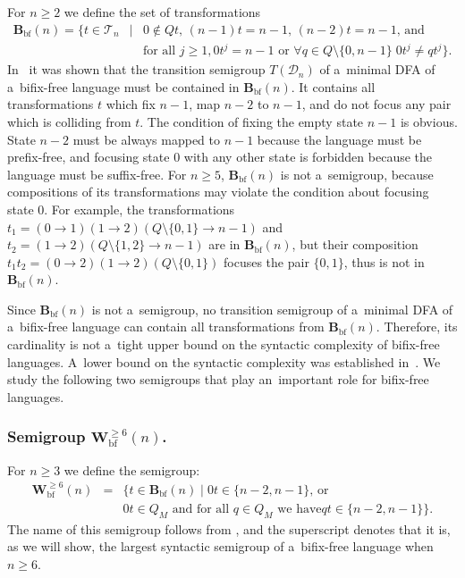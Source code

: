 \documentclass{amsart}
\renewcommand{\ge}{\geqslant}
\newcommand{\Bbf}{\mathbf{B}_{\mathrm{bf}}}
\newcommand{\Wbf}{\mathbf{W}^{\ge 6}_{\mathrm{bf}}}
\newcommand{\cD}{{\mathcal D}}
\newcommand{\cT}{{\mathcal T}}
\begin{document}
For $n \ge 2$ we define the set of transformations
\begin{eqnarray*}
\Bbf(n) = \{t \in \cT_n & \mid & 0 \notin Qt\text{, }(n-1)t=n-1\text{, }(n-2)t=n-1\text{, and}\\
& & \text{for all }j\ge 1, 0t^j = n-1\text{ or }\forall q \in Q\setminus \{0,n-1\}\;0t^j \neq qt^j\}.
\end{eqnarray*}
In~\cite{BLY12} it was shown that the transition semigroup $T(\cD_n)$ of a~minimal DFA of a~bifix-free
language must be contained in $\Bbf(n)$.
It contains all transformations $t$ which fix $n-1$, map $n-2$ to $n-1$, and do not focus any
pair which is colliding from $t$.
The condition of fixing the empty state $n-1$ is obvious. State $n-2$ must be always mapped to $n-1$ because the language must be prefix-free, and focusing state $0$ with any other state is forbidden because the language must be suffix-free.
For $n \ge 5$, $\Bbf(n)$ is not a~semigroup, because compositions of its transformations may violate the condition about focusing state $0$.
For example, the transformations $t_1 = (0 \to 1)(1 \to 2)(Q \setminus \{0,1\} \to n-1)$ and $t_2 = (1 \to 2)(Q \setminus \{1,2\} \to n-1)$ are in $\Bbf(n)$, but their composition $t_1 t_2 = (0 \to 2)(1 \to 2)(Q \setminus \{0,1\})$ focuses the pair $\{0,1\}$, thus is not in $\Bbf(n)$.

Since $\Bbf(n)$ is not a~semigroup, no transition semigroup of a~minimal DFA of a~bifix-free language can contain all transformations from $\Bbf(n)$.
Therefore, its cardinality is not a~tight upper bound on the syntactic complexity of bifix-free languages.
A~lower bound on the syntactic complexity was established in~\cite{BLY12}.
We study the following two semigroups that play an~important role for bifix-free languages.

\subsubsection{Semigroup $\Wbf(n)$.}

For $n \ge 3$ we define the semigroup:
\begin{eqnarray*}
\Wbf(n) & = & \{t \in \Bbf(n) \mid 0t \in \{n-2,n-1\}\text{, or}\\
& & 0t \in Q_M\text{ and for all $q \in Q_M$ we have} qt \in \{n-2,n-1\}\}.
\end{eqnarray*}
The name of this semigroup follows from \cite{BLY12}, and the superscript denotes that it is, as we will show, the largest syntactic semigroup of a~bifix-free language when $n \ge 6$.
\end{document}
